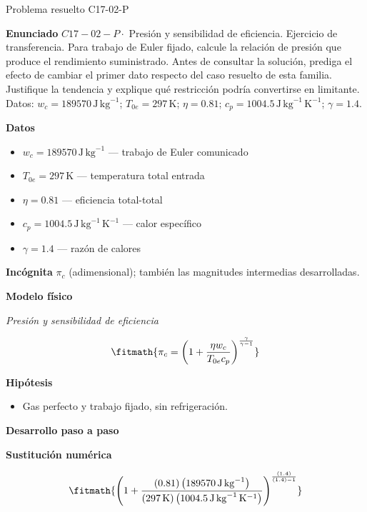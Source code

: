 \documentclass[10pt,openany]{book}
\begin{document}
\begin{studiumworked}{Problema resuelto C17-02-P}


\noindent\textbf{Enunciado}
\(C17-02-P \cdot\) Presión y sensibilidad de eficiencia. Ejercicio de transferencia. Para trabajo de Euler fijado, calcule la relación de presión que produce el rendimiento suministrado. Antes de consultar la solución, prediga el efecto de cambiar el primer dato respecto del caso resuelto de esta familia. Justifique la tendencia y explique qué restricción podría convertirse en limitante. Datos: \(w_c=189570\, \mathrm{J}\,\mathrm{kg}^{-1}\); \(T_{0e}=297\, \mathrm{K}\); \(\eta=0.81\); \(c_p=1004.5\, \mathrm{J}\,\mathrm{kg}^{-1}\,\mathrm{K}^{-1}\); \(\gamma=1.4\).

\noindent\textbf{Datos}
\begin{itemize}
\item $w_c = 189570\,\mathrm{J}\,\mathrm{kg}^{-1}$ — trabajo de Euler comunicado
\item $T_{0e} = 297\,\mathrm{K}$ — temperatura total entrada
\item $\eta = 0.81$ — eficiencia total-total
\item $c_p = 1004.5\,\mathrm{J}\,\mathrm{kg}^{-1}\,\mathrm{K}^{-1}$ — calor específico
\item $\gamma = 1.4$ — razón de calores
\end{itemize}

\noindent\textbf{Incógnita}
$\pi_c$ (adimensional); también las magnitudes intermedias desarrolladas.

\noindent\textbf{Modelo físico}

\noindent\textit{Presión y sensibilidad de eficiencia}

\[
\fitmath{\pi_c=\left(1 + \frac{\eta w_c}{T_{0e} c_p}\right)^{\frac{\gamma}{\gamma - 1}}}
\]

\noindent\textbf{Hipótesis}
\begin{itemize}
\item Gas perfecto y trabajo fijado, sin refrigeración.
\end{itemize}

\noindent\textbf{Desarrollo paso a paso}



\noindent\textbf{Sustitución numérica}

\[
\fitmath{\left(1 + \frac{\left(0.81\right) \left(189570\,\mathrm{J}\,\mathrm{kg}^{-1}\right)}{\left(297\,\mathrm{K}\right) \left(1004.5\,\mathrm{J}\,\mathrm{kg}^{-1}\,\mathrm{K}^{-1}\right)}\right)^{\frac{\left(1.4\right)}{\left(1.4\right) - 1}}}
\]


\end{studiumworked}
\end{document}
